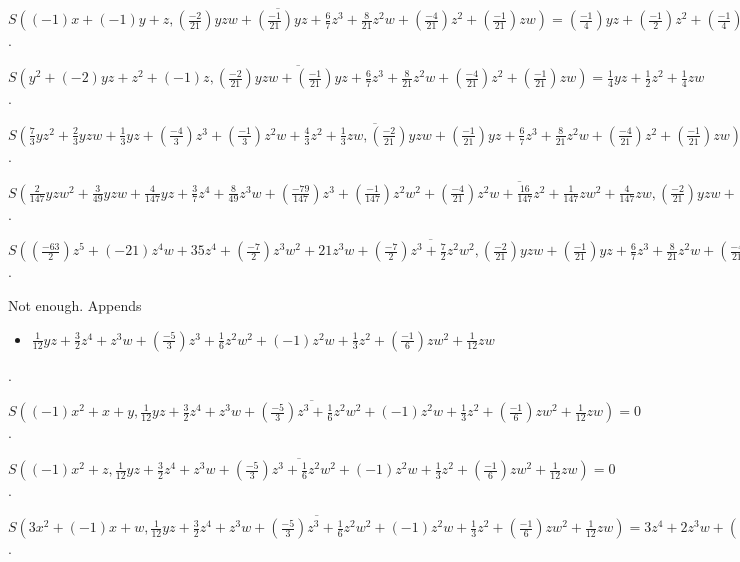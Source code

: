 $\overline{S((-1)x+(-1)y+z, (\frac{-2}{21})yzw+(\frac{-1}{21})yz+\frac{6}{7}z^{3}+\frac{8}{21}z^{2}w+(\frac{-4}{21})z^{2}+(\frac{-1}{21})zw)} = (\frac{-1}{4})yz+(\frac{-1}{2})z^{2}+(\frac{-1}{4})zw$.

$\overline{S(y^{2}+(-2)yz+z^{2}+(-1)z, (\frac{-2}{21})yzw+(\frac{-1}{21})yz+\frac{6}{7}z^{3}+\frac{8}{21}z^{2}w+(\frac{-4}{21})z^{2}+(\frac{-1}{21})zw)} = \frac{1}{4}yz+\frac{1}{2}z^{2}+\frac{1}{4}zw$.

$\overline{S(\frac{7}{3}yz^{2}+\frac{2}{3}yzw+\frac{1}{3}yz+(\frac{-4}{3})z^{3}+(\frac{-1}{3})z^{2}w+\frac{4}{3}z^{2}+\frac{1}{3}zw, (\frac{-2}{21})yzw+(\frac{-1}{21})yz+\frac{6}{7}z^{3}+\frac{8}{21}z^{2}w+(\frac{-4}{21})z^{2}+(\frac{-1}{21})zw)} = 0$.

$\overline{S(\frac{2}{147}yzw^{2}+\frac{3}{49}yzw+\frac{4}{147}yz+\frac{3}{7}z^{4}+\frac{8}{49}z^{3}w+(\frac{-79}{147})z^{3}+(\frac{-1}{147})z^{2}w^{2}+(\frac{-4}{21})z^{2}w+\frac{16}{147}z^{2}+\frac{1}{147}zw^{2}+\frac{4}{147}zw, (\frac{-2}{21})yzw+(\frac{-1}{21})yz+\frac{6}{7}z^{3}+\frac{8}{21}z^{2}w+(\frac{-4}{21})z^{2}+(\frac{-1}{21})zw)} = \frac{63}{2}z^{4}+21z^{3}w+(\frac{-7}{2})z^{3}+\frac{7}{2}z^{2}w^{2}$.

$\overline{S((\frac{-63}{2})z^{5}+(-21)z^{4}w+35z^{4}+(\frac{-7}{2})z^{3}w^{2}+21z^{3}w+(\frac{-7}{2})z^{3}+\frac{7}{2}z^{2}w^{2}, (\frac{-2}{21})yzw+(\frac{-1}{21})yz+\frac{6}{7}z^{3}+\frac{8}{21}z^{2}w+(\frac{-4}{21})z^{2}+(\frac{-1}{21})zw)} = 0$.

Not enough.  Appends \begin{itemize}
\item $\frac{1}{12}yz+\frac{3}{2}z^{4}+z^{3}w+(\frac{-5}{3})z^{3}+\frac{1}{6}z^{2}w^{2}+(-1)z^{2}w+\frac{1}{3}z^{2}+(\frac{-1}{6})zw^{2}+\frac{1}{12}zw$
\end{itemize}  .


$\overline{S((-1)x^{2}+x+y, \frac{1}{12}yz+\frac{3}{2}z^{4}+z^{3}w+(\frac{-5}{3})z^{3}+\frac{1}{6}z^{2}w^{2}+(-1)z^{2}w+\frac{1}{3}z^{2}+(\frac{-1}{6})zw^{2}+\frac{1}{12}zw)} = 0$.

$\overline{S((-1)x^{2}+z, \frac{1}{12}yz+\frac{3}{2}z^{4}+z^{3}w+(\frac{-5}{3})z^{3}+\frac{1}{6}z^{2}w^{2}+(-1)z^{2}w+\frac{1}{3}z^{2}+(\frac{-1}{6})zw^{2}+\frac{1}{12}zw)} = 0$.

$\overline{S(3x^{2}+(-1)x+w, \frac{1}{12}yz+\frac{3}{2}z^{4}+z^{3}w+(\frac{-5}{3})z^{3}+\frac{1}{6}z^{2}w^{2}+(-1)z^{2}w+\frac{1}{3}z^{2}+(\frac{-1}{6})zw^{2}+\frac{1}{12}zw)} = 3z^{4}+2z^{3}w+(\frac{-10}{3})z^{3}+\frac{1}{3}z^{2}w^{2}+(-2)z^{2}w+\frac{1}{3}z^{2}+(\frac{-1}{3})zw^{2}$.


